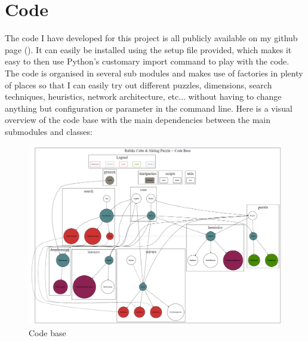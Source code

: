 
\chapter{Code} %

\label{Chapter3} %



The code I have developed for this project is all publicly available on my github page (\cite{FB}). It can easily be installed using the setup file provided, which makes it easy to then use Python's customary import command to play with the code.
The code is organised in several sub modules and makes use of factories in plenty of places so that I can easily try out different puzzles, dimensions, search techniques, heuristics, network architecture, etc... without having to change anything but configuration or parameter in the command line. Here is a visual overview of the code base with the main dependencies between the main submodules and classes:

\begin{landscape}
\begin{figure}[H]
\centering
\includegraphics[scale=0.5]{./Figures/codebase}
\caption[Codebase]{Code base}
\label{fig:Codebase}
\end{figure}
\end{landscape}


